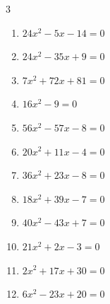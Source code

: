 \begin{multicols}{3}
\begin{enumerate}
  \item $24x^{2}-5x-14=0$


\columnbreak %

  \item $24x^{2}-35x+9=0$


  \item $7x^{2}+72x+81=0$


  \item $16x^{2}-9=0$


  \item $56x^{2}-57x-8=0$


  \item $20x^{2}+11x-4=0$


  \item $36x^{2}+23x-8=0$


  \item $18x^{2}+39x-7=0$


  \item $40x^{2}-43x+7=0$


  \item $21x^{2}+2x-3=0$


  \item $2x^{2}+17x+30=0$


\columnbreak %

\resetques

  \item $6x^{2}-23x+20=0$



\end{enumerate}
\end{multicols}
